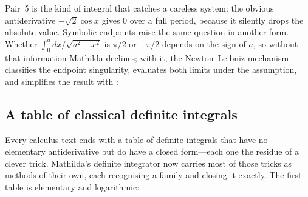 Pair~5 is the kind of integral that catches a careless system: the obvious
antiderivative \(-\sqrt2\cos x\) gives \(0\) over a full period, because it silently
drops the absolute value. Symbolic endpoints raise the same question in another
form. Whether \(\int_0^a dx/\sqrt{a^2-x^2}\) is \(\pi/2\) or \(-\pi/2\) depends on the
sign of \(a\), so without that information Mathilda declines; with it, the
Newton--Leibniz mechanism classifies the endpoint singularity, evaluates both limits
under the assumption, and simplifies the result with :

\begin{codepairs}
\end{codepairs}

\subsection{A table of classical definite integrals}
\label{ssec:calc-classical}

Every calculus text ends with a table of definite integrals that have no
elementary antiderivative but do have a closed form---each one the residue of a
clever trick. Mathilda's definite integrator now carries most of those tricks as
methods of their own, each recognising a family and closing it exactly. The first
table is elementary and logarithmic:

